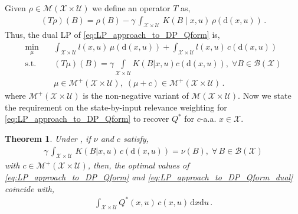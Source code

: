 \documentclass[journal]{IEEEtran}
\newtheorem{theorem}{Theorem}[section]
\newcommand{\mcal}{\mathcal}
\newcommand{\intd}[1]{\mathrm{d}#1}
\newcommand{\xinX}{x\!\in\!\mathcal{X}}
\newcommand{\spaceXbyU}{\mathcal{X}\times\mathcal{U}}
\begin{document}
Given $\rho\in\mcal{M}(\spaceXbyU)$ we define an operator $T$ as,
	\begin{equation} \nonumber \begin{aligned}
			\left( T \rho \right)(B) = \rho(B) - \gamma \, \int\nolimits_{\spaceXbyU} \, K\left( B \middle| x, u \right) \, \rho(\intd{(x,u)})
			\,.
		\end{aligned}
	\end{equation}
Thus, the dual LP of \eqref{eq:LP_approach_to_DP_Qform} is,
\begin{equation} \label{eq:LP_approach_to_DP_Qform_dual}
	\begin{aligned}
		\min\limits_{\mu} \quad&
			\int\nolimits_{\mcal{X} \times \mcal{U}} l(x,u) \, \mu(\intd{(x,u)})
			+ \int\nolimits_{\mcal{X} \times \mcal{U}} l(x,u) \, c(\intd{(x,u)})
		\\
		\text{s.t.} \quad& \left( T \mu \right) (B) = \gamma \int\limits_{\mcal{X} \times \mcal{U}} K(B|x,u) c(\intd{(x,u)})
			,\; \forall B \!\in\! \mcal{B}(\mcal{X})
		\\
		& \mu \in \mcal{M}^+(\spaceXbyU) ,\; (\mu+c) \in \mcal{M}^+(\spaceXbyU)
			\,.
	\end{aligned}
\end{equation}
where $\mcal{M}^+(\spaceXbyU)$ is the non-negative variant of $\mcal{M}(\spaceXbyU)$.
Now we state the requirement on the state-by-input relevance weighting for  \eqref{eq:LP_approach_to_DP_Qform} to recover $Q^\ast$ for $c$-a.a. $\xinX$.

\vspace{0.1cm}

\begin{theorem} \label{theorem:Q_primal_equiv}
	Under \cite[Assumptions 4.2.1(a), 4.2.1(b), 4.2.2]{hernandez_2012_discreteTimeMCP}, if $\nu$ and $c$ satisfy,
		\begin{equation} \label{theorem:Q_primal_equiv_eq1}
			\begin{aligned}
				\gamma \, \int\nolimits_{\mcal{X} \times \mcal{U}} \, K(B|x,u) \, c(\intd{(x,u)}) = \nu(B)
					,\; \forall\, B \in \mcal{B}(\mcal{X})
			\end{aligned}
		\end{equation}
	with $c \in \mcal{M}^+(\spaceXbyU)$, then,
the optimal values of \eqref{eq:LP_approach_to_DP_Qform} and \eqref{eq:LP_approach_to_DP_Qform_dual} coincide with,
\begin{equation} \nonumber
		\begin{aligned}
			\int\nolimits_{\spaceXbyU} Q^\ast(x,u) \, c(x,u) \, \intd{x} \intd{u}
			\,.
		\end{aligned}
	\end{equation}
\end{theorem}
\end{document}

